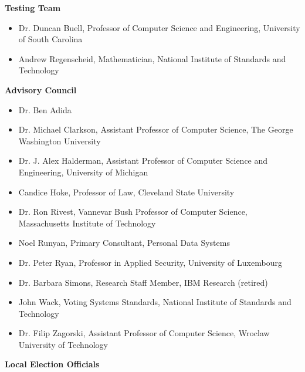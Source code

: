 \textbf{Testing Team}

\begin{itemize}

\item Dr. Duncan Buell, Professor of Computer Science and Engineering,
  University of South Carolina
 
\item Andrew Regenscheid, Mathematician, National Institute of
  Standards and Technology

\end{itemize}

\textbf{Advisory Council}

\begin{itemize}

\item Dr. Ben Adida
 
\item Dr. Michael Clarkson, Assistant Professor of Computer Science,
  The George Washington University
 
\item Dr. J. Alex Halderman, Assistant Professor of Computer Science
  and Engineering, University of Michigan
 
\item Candice Hoke, Professor of Law, Cleveland State University
 
\item Dr. Ron Rivest, Vannevar Bush Professor of Computer Science,
  Massachusetts Institute of Technology
 
\item Noel Runyan, Primary Consultant, Personal Data Systems
 
\item Dr. Peter Ryan, Professor in Applied Security, University of
  Luxembourg
 
\item Dr. Barbara Simons, Research Staff Member, IBM Research
  (retired)
 
\item John Wack, Voting Systems Standards, National Institute of
  Standards and Technology
 
\item Dr. Filip Zagorski, Assistant Professor of Computer Science,
  Wroclaw University of Technology

\end{itemize}

\textbf{Local Election Officials}

